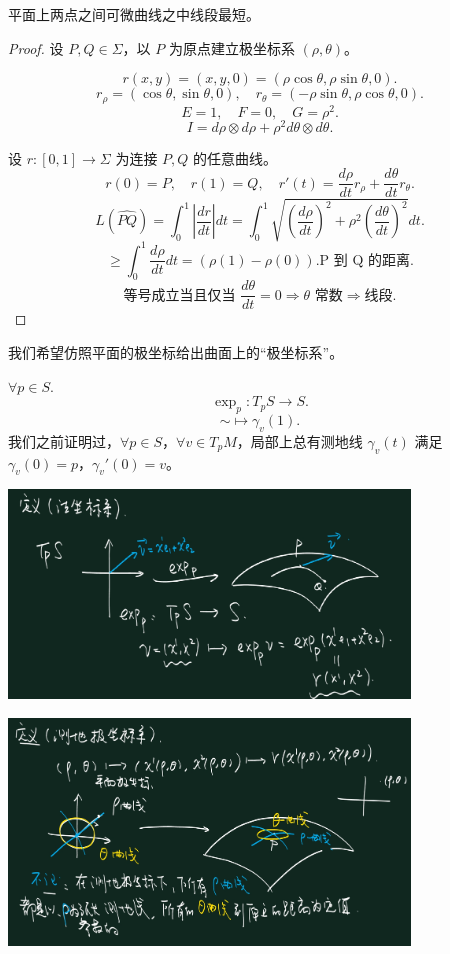 \documentclass[lang=cn,10pt,thmcnt=section]{elegantbook}
\begin{document}
\begin{theorem}
    平面上两点之间可微曲线之中线段最短。
\end{theorem}
\begin{proof}
    设 $P, Q \in \Sigma$，以 $P$ 为原点建立极坐标系 $(\rho, \theta)$。

\[
r(x, y) = (x, y, 0) = (\rho \cos \theta, \rho \sin \theta, 0).
\]
\[
r_{\rho} = (\cos \theta, \sin \theta, 0), \quad r_{\theta} = (-\rho \sin \theta, \rho \cos \theta, 0).
\]
\[
E = 1, \quad F = 0, \quad G = \rho^2.
\]
\[
I = d\rho \otimes d\rho + \rho^2 d\theta \otimes d\theta.
\]

设 $r: [0,1] \rightarrow \Sigma$ 为连接 $P, Q$ 的任意曲线。
\[
r(0) = P, \quad r(1) = Q, \quad r'(t) = \frac{d\rho}{dt} r_{\rho} + \frac{d\theta}{dt} r_{\theta}.
\]
\[
L(\widehat{PQ}) = \int_0^1 \left| \frac{dr}{dt} \right| dt = \int_0^1 \sqrt{\left( \frac{d\rho}{dt} \right)^2 + \rho^2 \left( \frac{d\theta}{dt} \right)^2} dt.
\]
\[
\geq \int_0^1 \frac{d\rho}{dt} dt = (\rho(1) - \rho(0)).\text{P 到 Q 的距离}.
\]
\[
\text{等号成立当且仅当 } \frac{d\theta}{dt} = 0 \Rightarrow \theta \text{ 常数} \Rightarrow \text{线段}.
\]

\end{proof}
我们希望仿照平面的极坐标给出曲面上的“极坐标系”。
\begin{definition}[指数映射]
    $\forall p \in S$.
\[
\exp_p: T_pS \longrightarrow S.
\]
\[
\sim \longmapsto \gamma_v(1).
\]
我们之前证明过，$\forall p \in S$，$\forall v \in T_pM$，局部上总有测地线 $\gamma_v(t)$ 满足 $\gamma_v(0) = p$，$\gamma_v'(0) = v$。
\end{definition}


\includegraphics[width=0.8\textwidth]{figure/法坐标系.png}

\includegraphics[width=0.8\textwidth]{figure/测地坐标系.png}
\end{document}
